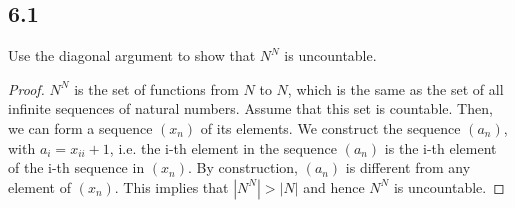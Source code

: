 \subsection*{6.1} Use the diagonal argument to show that $N^N$ is uncountable.

\begin{proof}
$N^N$ is the set of functions from $N$ to $N$, which is the same as the set of all infinite sequences of natural numbers. Assume that this set is countable. Then, we can form a sequence $(x_n)$ of its elements. We construct the sequence $(a_n)$, with $a_i = x_{ii}+1$, i.e. the i-th element in the sequence $(a_n)$ is the i-th element of the i-th sequence in $(x_n)$. By construction, $(a_n)$ is different from any element of $(x_n)$. This implies that $|N^N|>|N|$ and hence $N^N$ is uncountable.
\end{proof}

